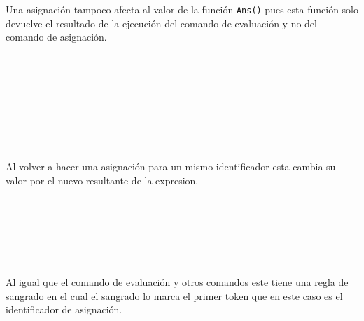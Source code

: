      Una asignación tampoco afecta al valor de la función \texttt{Ans()} pues esta función solo devuelve el resultado de la ejecución del comando de evaluación y no del comando de asignación.
      
      \begin{fxcode}
         \\
         \\
         \\
         \\
          \\
          \\
         \\
      \end{fxcode}
      
      Al volver a hacer una asignación para un mismo identificador esta cambia su valor por el nuevo resultante de la expresion.
      
      \begin{fxcode}
         \\
         \\
         \\
         \\
         \\
      \end{fxcode}
      
      Al igual que el comando de evaluación y otros comandos este tiene una regla de sangrado en el cual el sangrado lo marca el primer token que en este caso es el identificador de asignación.
      \\
      
      \begin{fxcode}
         \\
      \end{fxcode}
      
      \begin{fxcode}
         \\
          
      \end{fxcode}
      
